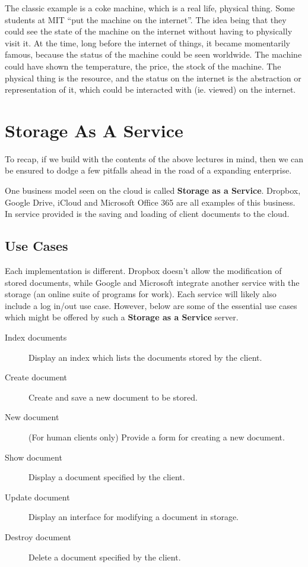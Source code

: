 \documentclass[11pt]{article}
\begin{document}
The classic example is a coke machine, which is a real life, physical thing. Some students at MIT ``put the machine on the internet''. The idea being that they could see the state of the machine on the internet without having to physically visit it. At the time, long before the internet of things, it became momentarily famous, because the status of the machine could be seen worldwide. The machine could have shown the temperature, the price, the stock of the machine. The physical thing is the resource, and the status on the internet is the abstraction or representation of it, which could be interacted with (ie. viewed) on the internet.



\section{Storage As A Service}

To recap, if we build with the contents of the above lectures in mind, then we can be ensured to dodge a few pitfalls ahead in the road of a expanding enterprise.

One business model seen on the cloud is called \textbf{Storage as a Service}. Dropbox, Google Drive, iCloud and Microsoft Office 365 are all examples of this business. In service provided is the saving and loading of client documents to the cloud.

\subsection{Use Cases}

Each implementation is different. Dropbox doesn't allow the modification of stored documents, while Google and Microsoft integrate another service with the storage (an online suite of programs for work). Each service will likely also include a log in/out use case. However, below are some of the essential use cases which might be offered by such a \textbf{Storage as a Service} server.

\begin{description}
\item[Index documents] Display an index which lists the documents stored by the client.
\item[Create document] Create and save a new document to be stored.
\item[New document] (For human clients only) Provide a form for creating a new document.
\item[Show document] Display a document specified by the client.
\item[Update document] Display an interface for modifying a document in storage.
\item[Destroy document] Delete a document specified by the client.
\end{description}
\end{document}
